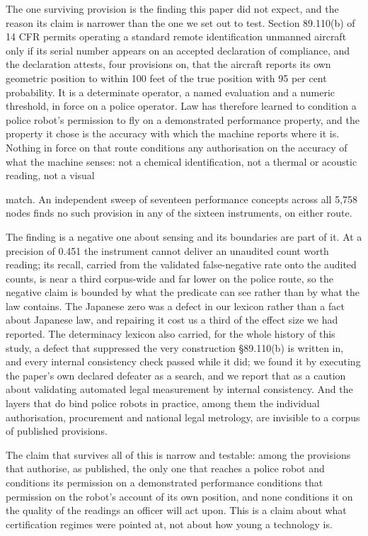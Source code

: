 The one surviving provision is the finding this paper did not expect, and the reason its claim is narrower than the one we set out to test. Section 89.110(b) of 14 CFR permits operating a standard remote identification unmanned aircraft only if its serial number appears on an accepted declaration of compliance, and the declaration attests, four provisions on, that the aircraft reports its own geometric position to within 100 feet of the true position with 95 per cent probability. It is a determinate operator, a named evaluation and a numeric threshold, in force on a police operator. Law has therefore learned to condition a police robot's permission to fly on a demonstrated performance property, and the property it chose is the accuracy with which the machine reports where it is. Nothing in force on that route conditions any authorisation on the accuracy of what the machine senses: not a chemical identification, not a thermal or acoustic reading, not a visual

match. An independent sweep of seventeen performance concepts across all 5,758 nodes finds no such provision in any of the sixteen instruments, on either route.

The finding is a negative one about sensing and its boundaries are part of it. At a precision of 0.451 the instrument cannot deliver an unaudited count worth reading; its recall, carried from the validated false-negative rate onto the audited counts, is near a third corpus-wide and far lower on the police route, so the negative claim is bounded by what the predicate can see rather than by what the law contains. The Japanese zero was a defect in our lexicon rather than a fact about Japanese law, and repairing it cost us a third of the effect size we had reported. The determinacy lexicon also carried, for the whole history of this study, a defect that suppressed the very construction \S{}89.110(b) is written in, and every internal consistency check passed while it did; we found it by executing the paper's own declared defeater as a search, and we report that as a caution about validating automated legal measurement by internal consistency. And the layers that do bind police robots in practice, among them the individual authorisation, procurement and national legal metrology, are invisible to a corpus of published provisions.

The claim that survives all of this is narrow and testable: among the provisions that authorise, as published, the only one that reaches a police robot and conditions its permission on a demonstrated performance conditions that permission on the robot's account of its own position, and none conditions it on the quality of the readings an officer will act upon. This is a claim about what certification regimes were pointed at, not about how young a technology is.

